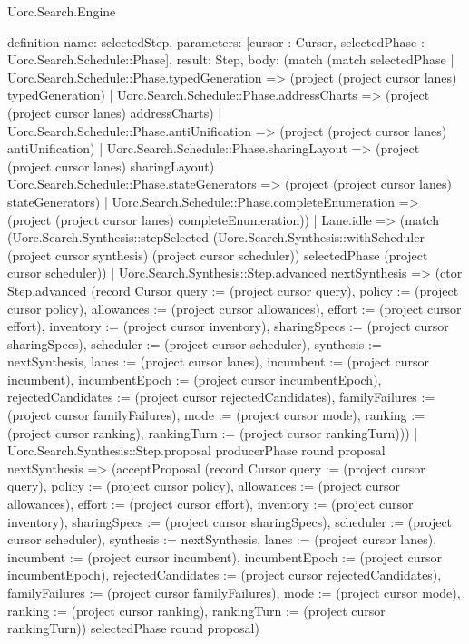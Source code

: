 \begin{lexlean}{Uorc.Search.Engine}
\begin{semanticmodule}
definition{
  name: selectedStep,
  parameters: [cursor : Cursor, selectedPhase : Uorc.Search.Schedule::Phase],
  result: Step,
  body: (match (match selectedPhase
      | Uorc.Search.Schedule::Phase.typedGeneration => (project (project cursor lanes) typedGeneration)
      | Uorc.Search.Schedule::Phase.addressCharts => (project (project cursor lanes) addressCharts)
      | Uorc.Search.Schedule::Phase.antiUnification => (project (project cursor lanes) antiUnification)
      | Uorc.Search.Schedule::Phase.sharingLayout => (project (project cursor lanes) sharingLayout)
      | Uorc.Search.Schedule::Phase.stateGenerators => (project (project cursor lanes) stateGenerators)
      | Uorc.Search.Schedule::Phase.completeEnumeration => (project (project cursor lanes) completeEnumeration))
    | Lane.idle => (match (Uorc.Search.Synthesis::stepSelected (Uorc.Search.Synthesis::withScheduler (project cursor synthesis) (project cursor scheduler)) selectedPhase (project cursor scheduler))
      | Uorc.Search.Synthesis::Step.advanced nextSynthesis => (ctor Step.advanced (record Cursor {query := (project cursor query), policy := (project cursor policy), allowances := (project cursor allowances), effort := (project cursor effort), inventory := (project cursor inventory), sharingSpecs := (project cursor sharingSpecs), scheduler := (project cursor scheduler), synthesis := nextSynthesis, lanes := (project cursor lanes), incumbent := (project cursor incumbent), incumbentEpoch := (project cursor incumbentEpoch), rejectedCandidates := (project cursor rejectedCandidates), familyFailures := (project cursor familyFailures), mode := (project cursor mode), ranking := (project cursor ranking), rankingTurn := (project cursor rankingTurn)}))
      | Uorc.Search.Synthesis::Step.proposal producerPhase round proposal nextSynthesis => (acceptProposal (record Cursor {query := (project cursor query), policy := (project cursor policy), allowances := (project cursor allowances), effort := (project cursor effort), inventory := (project cursor inventory), sharingSpecs := (project cursor sharingSpecs), scheduler := (project cursor scheduler), synthesis := nextSynthesis, lanes := (project cursor lanes), incumbent := (project cursor incumbent), incumbentEpoch := (project cursor incumbentEpoch), rejectedCandidates := (project cursor rejectedCandidates), familyFailures := (project cursor familyFailures), mode := (project cursor mode), ranking := (project cursor ranking), rankingTurn := (project cursor rankingTurn)}) selectedPhase round proposal)
}
\end{semanticmodule}
\end{lexlean}
